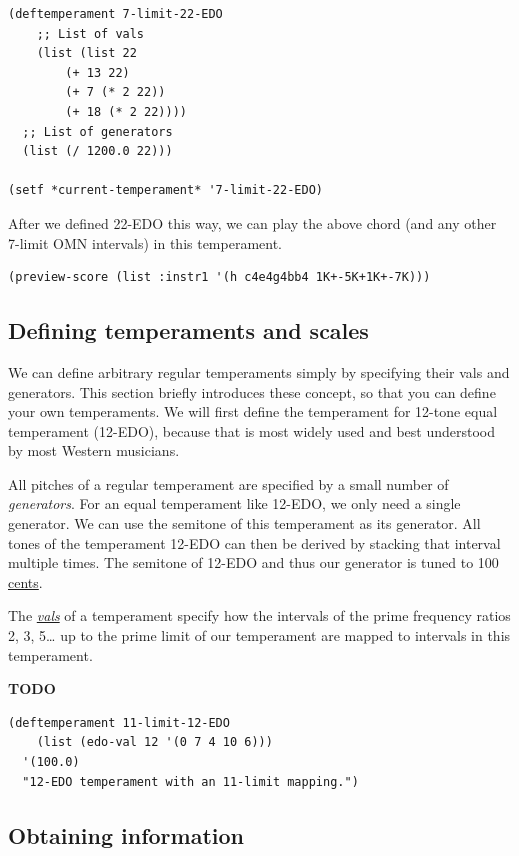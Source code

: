 \documentclass[11pt]{article}
\begin{document}
\begin{verbatim}
(deftemperament 7-limit-22-EDO
    ;; List of vals
    (list (list 22
		(+ 13 22)
		(+ 7 (* 2 22))
		(+ 18 (* 2 22))))
  ;; List of generators
  (list (/ 1200.0 22)))

(setf *current-temperament* '7-limit-22-EDO)
\end{verbatim}

After we defined 22-EDO this way, we can play the above chord (and any other 7-limit OMN
intervals) in this temperament.


\begin{verbatim}
(preview-score (list :instr1 '(h c4e4g4bb4 1K+-5K+1K+-7K)))
\end{verbatim}



\subsection{Defining temperaments and scales}
\label{sec:org1bb9c31}

We can define arbitrary regular temperaments simply by specifying their vals and generators. This
section briefly introduces these concept, so that you can define your own temperaments. We will
first define the temperament for 12-tone equal temperament (12-EDO), because that is most widely
used and best understood by most Western musicians. 

All pitches of a regular temperament are specified by a small number of \emph{generators}. For an
equal temperament like 12-EDO, we only need a single generator. We can use the semitone of this
temperament as its generator. All tones of the temperament 12-EDO can then be derived by
stacking that interval multiple times. The semitone of 12-EDO and thus our generator is tuned to
100 \href{https://en.wikipedia.org/wiki/Cent\_(music)}{cents}.

The \href{https://en.xen.wiki/w/Val}{\emph{vals}} of a temperament specify how the intervals of the prime frequency ratios 2, 3,
5\ldots{} up to the prime limit of our temperament are mapped to intervals in this temperament. 

\textbf{TODO}


\begin{verbatim}
(deftemperament 11-limit-12-EDO
    (list (edo-val 12 '(0 7 4 10 6)))
  '(100.0)
  "12-EDO temperament with an 11-limit mapping.")
\end{verbatim}


\subsection{Obtaining information}
\label{sec:org6a04364}
\end{document}
